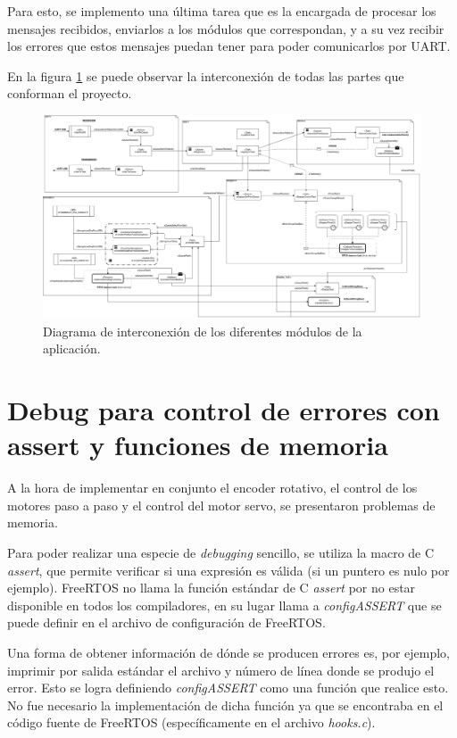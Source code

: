 \documentclass{IEEEtran}
\begin{document}
Para esto, se implemento una última tarea que es la encargada de procesar los mensajes recibidos, enviarlos a los módulos que correspondan, y a su vez recibir los errores que estos mensajes puedan tener para poder comunicarlos por UART.

En la figura \ref{fig:diagrama-app} se puede observar la interconexión de todas las partes que conforman el proyecto.

\begin{figure}
    \centering
    \includegraphics[scale=0.35]{../diagrama_app.png}
    \caption{Diagrama de interconexión de los diferentes módulos de la aplicación.}
    \label{fig:diagrama-app}
\end{figure}

\section{Debug para control de errores con assert y funciones de memoria}
\label{sec:debug}

A la hora de implementar en conjunto el encoder rotativo, el control de los motores paso a paso y el control del motor servo, se presentaron problemas de memoria.

Para poder realizar una especie de \textit{debugging} sencillo, se utiliza la macro de C \textit{assert}, que permite verificar si una expresión es válida (si un puntero es nulo por ejemplo). FreeRTOS no llama la función estándar de C \textit{assert} por no estar disponible en todos los compiladores, en su lugar llama a \textit{configASSERT} que se puede definir en el archivo de configuración de FreeRTOS.

Una forma de obtener información de dónde se producen errores es, por ejemplo, imprimir por salida estándar el archivo y número de línea donde se produjo el error. Esto se logra definiendo \textit{configASSERT} como una función que realice esto. No fue necesario la implementación de dicha función ya que se encontraba en el código fuente de FreeRTOS (específicamente en el archivo \textit{hooks.c}).
\end{document}
